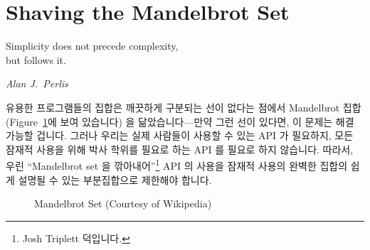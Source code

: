 \section{Shaving the Mandelbrot Set}
\label{sec:easy:Shaving the Mandelbrot Set}
%
\epigraph{Simplicity does not precede complexity, \\ but follows it.}
	 {\emph{Alan J.~Perlis}}

유용한 프로그램들의 집합은 깨끗하게 구분되는 선이 없다는 점에서 Mandelbrot 집합
(Figure~\ref{fig:easy:Mandelbrot Set}에 보여 있습니다) 을 닮았습니다---만약
그런 선이 있다면, 이 문제는 해결 가능할 겁니다.
그러나 우리는 실제 사람들이 사용할 수 있는 API 가 필요하지, 모든 잠재적 사용을
위해 박사 학위를 필요로 하는 API 를 필요로 하지 않습니다.
따라서, 우린 ``Mandelbrot set 을 깎아내어''\footnote{
	Josh Triplett 덕입니다.}
API 의 사용을 잠재적 사용의 완벽한 집합의 쉽게 설명될 수 있는 부분집합으로
제한해야 합니다.

\begin{figure}[tbp]
\centering
{}
\caption{Mandelbrot Set (Courtesy of Wikipedia)}
\label{fig:easy:Mandelbrot Set}
\end{figure}

